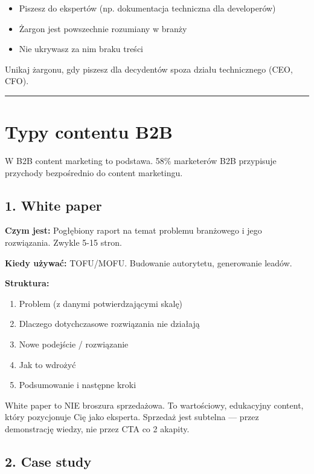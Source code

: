\documentclass[
  12pt,
  a4paper,
  twoside,
  openright,
  12pt,
  DIV=12,
  BCOR=12mm]{scrbook}
\providecommand{\tightlist}{%
  \setlength{\itemsep}{0pt}\setlength{\parskip}{0pt}}\usepackage{longtable,booktabs,array}
\newcommand{\decoline}{%
  \begin{center}
    \textcolor{bordergray}{\rule{0.3\textwidth}{0.5pt}}
  \end{center}
}
\begin{document}
\begin{itemize}
\tightlist
\item
  Piszesz do ekspertów (np. dokumentacja techniczna dla developerów)
\item
  Żargon jest powszechnie rozumiany w branży
\item
  Nie ukrywasz za nim braku treści
\end{itemize}

Unikaj żargonu, gdy piszesz dla decydentów spoza działu technicznego
(CEO, CFO).

\decoline

\section{Typy contentu B2B}\label{typy-contentu-b2b}

W B2B content marketing to podstawa. 58\% marketerów B2B przypisuje
przychody bezpośrednio do content marketingu.

\subsection{1. White paper}\label{white-paper}

\textbf{Czym jest:} Pogłębiony raport na temat problemu branżowego i
jego rozwiązania. Zwykle 5-15 stron.

\textbf{Kiedy używać:} TOFU/MOFU. Budowanie autorytetu, generowanie
leadów.

\textbf{Struktura:}

\begin{enumerate}
\def\labelenumi{\arabic{enumi}.}
\tightlist
\item
  Problem (z danymi potwierdzającymi skalę)
\item
  Dlaczego dotychczasowe rozwiązania nie działają
\item
  Nowe podejście / rozwiązanie
\item
  Jak to wdrożyć
\item
  Podsumowanie i następne kroki
\end{enumerate}

\begin{wskazowka}
White paper to NIE broszura sprzedażowa. To wartościowy, edukacyjny content, który pozycjonuje Cię jako eksperta. Sprzedaż jest subtelna --- przez demonstrację wiedzy, nie przez CTA co 2 akapity.
\end{wskazowka}

\subsection{2. Case study}\label{case-study}
\end{document}

